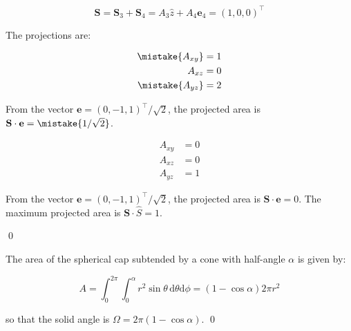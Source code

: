 \documentclass[12pt]{article}
\begin{document}
\begin{correction}
    \begin{equation}
        \mathbf{S} = \mathbf{S}_{3} + \mathbf{S}_{4} = A_{3} \hat{z} + A_{4} \mathbf{e}_{4} = \left( 1, 0, 0 \right)^{\intercal}
    \end{equation}
\end{correction}

The projections are:

\begin{equation}
\begin{split}
    \mistake{A_{xy}} &= 1 \\
    A_{xz} &= 0 \\
    \mistake{A_{yz}} &= 2
\end{split}
\end{equation}

From the vector $\mathbf{e} = (0, -1, 1)^{\intercal}/\sqrt{2}$, the projected area is $\mathbf{S} \cdot \mathbf{e} = \mistake{1/\sqrt{2}}$.

\begin{correction}
    \begin{equation}
    \begin{split}
        A_{xy} &= 0 \\
        A_{xz} &= 0 \\
        A_{yz} &= 1
    \end{split}
    \end{equation}

    From the vector $\mathbf{e} = (0, -1, 1)^{\intercal}/\sqrt{2}$, the projected area is $\mathbf{S} \cdot \mathbf{e} = 0$. The maximum projected area is $\mathbf{S} \cdot \hat{S} = 1$.
\end{correction}
\qed


The area of the spherical cap subtended by a cone with half-angle $\alpha$ is given by:

\begin{equation}
    A = \int_{0}^{2\pi} \int_{0}^{\alpha} r^{2} \sin{\theta} \, \mathrm{d}\theta \mathrm{d}\phi = (1 - \cos{\alpha}) 2\pi r^{2}
\end{equation}

so that the solid angle is $\Omega = 2\pi (1 - \cos{\alpha})$.
\qed


\end{document}

